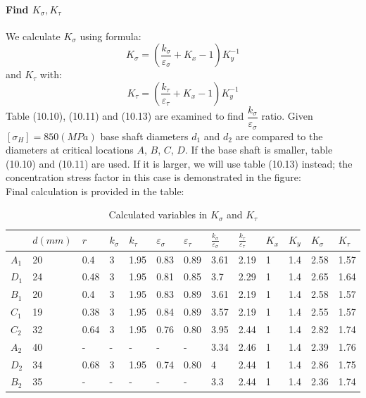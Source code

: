 \paragraph{Find $ K_{\sigma}, K_\tau $} We calculate $ K_{\sigma} $ using formula:
\[ K_{\sigma} = \left( \dfrac{k_\sigma}{\varepsilon_\sigma} + K_x - 1\right) K_y^{-1} \]
and $ K_\tau $ with:
\[ K_{\tau} = \left( \dfrac{k_\tau}{\varepsilon_\tau} + K_x - 1\right) K_y^{-1} \]
Table (10.10), (10.11) and (10.13) are examined to find $ \dfrac{k_\sigma}{\varepsilon_\sigma} $ ratio. Given $ [\sigma_H] = 850 \unit{(MPa)} $ base shaft diameters $ d_1 $ and $ d_2 $ are compared to the diameters at critical locations $ A $, $ B $, $ C $, $ D $. If the base shaft is smaller, table (10.10) and (10.11) are used. If it is larger, we will use table (10.13) instead; the concentration stress factor in this case is demonstrated in the figure:\\


Final calculation is provided in the table:\newpage

\begin{table}[ht]
	\begin{tabular}{|l|l|l|l|l|l|l|l|l|l|l|l|l|}
		\hline
		\rowcolor[HTML]{C0C0C0} 
		&
		$d\unit{(mm)}$ &
		$r$ &
		$k_\sigma$ &
		$k_\tau$ &
		$\varepsilon_\sigma$ &
		$\varepsilon_\tau$ &
		$\frac{k_\sigma}{\varepsilon_\sigma}$ &
		$\frac{k_\tau}{\varepsilon_\tau}$ &
		$K_x$ &
		$K_y$ &
		$K_\sigma$ &
		$K_\tau$ \\ \hline
		\cellcolor[HTML]{C0C0C0}$A_1$ & 20 & 0.4  & 3 & 1.95 & 0.83 & 0.89 & 3.61 & 2.19 & 1 & 1.4 & 2.58 & 1.57 \\ \hline
		\cellcolor[HTML]{C0C0C0}$D_1$ & 24 & 0.48 & 3 & 1.95 & 0.81 & 0.85 & 3.7  & 2.29 & 1 & 1.4 & 2.65 & 1.64 \\ \hline
		\cellcolor[HTML]{C0C0C0}$B_1$ & 20 & 0.4  & 3 & 1.95 & 0.83 & 0.89 & 3.61 & 2.19 & 1 & 1.4 & 2.58 & 1.57 \\ \hline
		\cellcolor[HTML]{C0C0C0}$C_1$ & 19 & 0.38 & 3 & 1.95 & 0.84 & 0.89 & 3.57 & 2.19 & 1 & 1.4 & 2.55 & 1.57 \\ \hline
		\cellcolor[HTML]{C0C0C0}$C_2$ & 32 & 0.64 & 3 & 1.95 & 0.76 & 0.80 & 3.95 & 2.44 & 1 & 1.4 & 2.82 & 1.74 \\ \hline
		\cellcolor[HTML]{C0C0C0}$A_2$ & 40 & -    & - & -    & -    & -    & 3.34 & 2.46 & 1 & 1.4 & 2.39 & 1.76 \\ \hline
		\cellcolor[HTML]{C0C0C0}$D_2$ & 34 & 0.68 & 3 & 1.95 & 0.74 & 0.80 & 4 & 2.44 & 1 & 1.4 & 2.86 & 1.75 \\ \hline
		\cellcolor[HTML]{C0C0C0}$B_2$ & 35 & -    & - & -    & -    & -    & 3.3  & 2.44 & 1 & 1.4 & 2.36 & 1.74 \\ \hline
	\end{tabular}
	\caption{Calculated variables in $ K_\sigma $ and $ K_\tau $}
\end{table}
